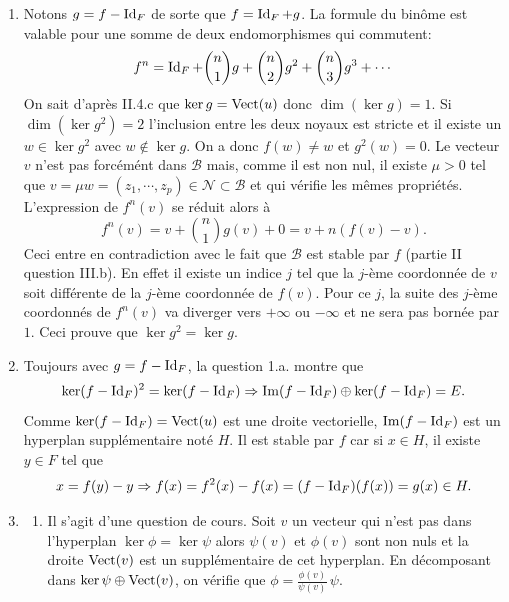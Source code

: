 \begin{enumerate}
 \item Notons $g = f - \operatorname{Id}_F$ de sorte que $f=\operatorname{Id}_F +g$. La formule du binôme est valable pour une somme de deux endomorphismes qui commutent:
\begin{displaymath}
 f^n = \operatorname{Id}_F + \binom{n}{1}g + \binom{n}{2}g^2 + \binom{n}{3}g^3 + \cdots 
\end{displaymath}
On sait d'après II.4.c que $\ker g = \operatorname{Vect}(u)$ donc $\dim(\ker g) = 1$. Si $\dim(\ker g^2) =2$ l'inclusion entre les deux noyaux est stricte et il existe un $w \in \ker g^2$ avec $w \notin \ker g$. On a donc $f(w)\neq w$ et $g^2(w)=0$. Le vecteur $v$ n'est pas forcémént dans $\mathcal{B}$ mais, comme il est non nul, il existe $\mu >0$ tel que $v = \mu w =(z_1,\cdots,z_p)\in \mathcal{N} \subset \mathcal{B}$ et qui vérifie les mêmes propriétés. L'expression de $f^n(v)$ se réduit alors à
\begin{displaymath}
 f^n(v) = v + \binom{n}{1}g(v) + 0 = v +n(f(v)-v) .
\end{displaymath}
Ceci entre en contradiction avec le fait que $\mathcal{B}$ est stable par $f$ (partie II question III.b). En effet il existe un indice $j$ tel que la $j$-ème coordonnée de $v$ soit différente de la $j$-ème coordonnée de $f(v)$. Pour ce $j$, la suite des $j$-ème coordonnés de $f^n(v)$ va diverger vers $+\infty$ ou $-\infty$ et ne sera pas bornée par $1$. 
Ceci prouve que $\ker g^2 = \ker g$.

\item Toujours avec $g = f - \operatorname{Id}_F$, la question 1.a. montre que 
\[
  \ker(f - \operatorname{Id}_F)^2 = \ker(f- \operatorname{Id}_F) \Rightarrow \operatorname{Im} (f- \operatorname{Id}_F) \oplus \ker (f- \operatorname{Id}_F) = E. 
\]
Comme $\ker (f - \operatorname{Id}_F) =\operatorname{Vect}(u)$ est une droite vectorielle, $\operatorname{Im} (f - \operatorname{Id}_F)$ est un hyperplan supplémentaire noté $H$.\newline
Il est stable par $f$ car si $x\in H$, il existe $y \in F$ tel que
\begin{displaymath}
 x = f(y) -y \Rightarrow f(x) = f^2(x)-f(x)=(f-\operatorname{Id}_F)(f(x))=g(x)\in H .
\end{displaymath}
 
 \item 
\begin{enumerate}
 \item Il s'agit d'une question de cours. Soit $v$ un vecteur qui n'est pas dans l'hyperplan $\ker \phi = \ker \psi$ alors $\psi(v)$ et $\phi(v)$ sont non nuls et la droite $\operatorname{Vect}(v)$ est un supplémentaire de cet hyperplan. En décomposant dans $\ker \psi \oplus \operatorname{Vect}(v)$, on vérifie que $\phi = \frac{\phi(v)}{\psi(v)}\,\psi$.


\end{enumerate}
\end{enumerate}
